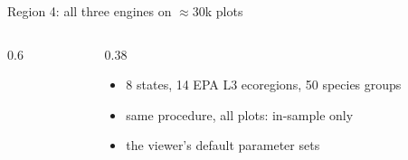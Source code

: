 \begin{frame}{Region 4: all three engines on $\approx$30k plots}
\begin{columns}[T]
\begin{column}{0.6\textwidth}
\end{column}
\begin{column}{0.38\textwidth}
\small
\begin{itemize}\setlength\itemsep{2pt}
\item 8 states, 14 EPA L3 ecoregions, 50 species groups
\item same procedure, all plots: in-sample only
\item the viewer's default parameter sets
\end{itemize}
\end{column}
\end{columns}
\end{frame}

